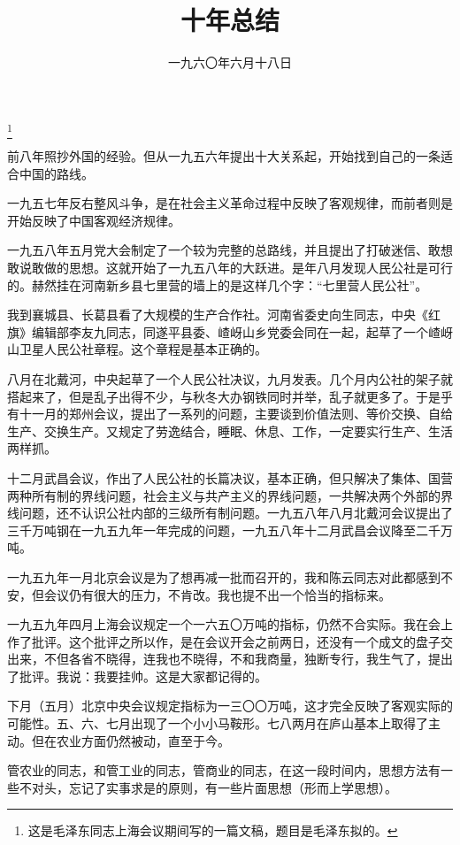 
\title{十年总结}
\date{一九六〇年六月十八日}
\thanks{这是毛泽东同志上海会议期间写的一篇文稿，题目是毛泽东拟的。}
\maketitle


前八年照抄外国的经验。但从一九五六年提出十大关系起，开始找到自己的一条适合中国的路线。

一九五七年反右整风斗争，是在社会主义革命过程中反映了客观规律，而前者则是开始反映了中国客观经济规律。

一九五八年五月党大会制定了一个较为完整的总路线，并且提出了打破迷信、敢想敢说敢做的思想。这就开始了一九五八年的大跃进。是年八月发现人民公社是可行的。赫然挂在河南新乡县七里营的墙上的是这样几个字：“七里营人民公社”。

我到襄城县、长葛县看了大规模的生产合作社。河南省委史向生同志，中央《红旗》编辑部李友九同志，同遂平县委、嵖岈山乡党委会同在一起，起草了一个嵖岈山卫星人民公社章程。这个章程是基本正确的。

八月在北戴河，中央起草了一个人民公社决议，九月发表。几个月内公社的架子就搭起来了，但是乱子出得不少，与秋冬大办钢铁同时并举，乱子就更多了。于是乎有十一月的郑州会议，提出了一系列的问题，主要谈到价值法则、等价交换、自给生产、交换生产。又规定了劳逸结合，睡眠、休息、工作，一定要实行生产、生活两样抓。

十二月武昌会议，作出了人民公社的长篇决议，基本正确，但只解决了集体、国营两种所有制的界线问题，社会主义与共产主义的界线问题，一共解决两个外部的界线问题，还不认识公社内部的三级所有制问题。一九五八年八月北戴河会议提出了三千万吨钢在一九五九年一年完成的问题，一九五八年十二月武昌会议降至二千万吨。

一九五九年一月北京会议是为了想再减一批而召开的，我和陈云同志对此都感到不安，但会议仍有很大的压力，不肯改。我也提不出一个恰当的指标来。

一九五九年四月上海会议规定一个一六五〇万吨的指标，仍然不合实际。我在会上作了批评。这个批评之所以作，是在会议开会之前两日，还没有一个成文的盘子交出来，不但各省不晓得，连我也不晓得，不和我商量，独断专行，我生气了，提出了批评。我说：我要挂帅。这是大家都记得的。

下月（五月）北京中央会议规定指标为一三〇〇万吨，这才完全反映了客观实际的可能性。五、六、七月出现了一个小小马鞍形。七八两月在庐山基本上取得了主动。但在农业方面仍然被动，直至于今。

管农业的同志，和管工业的同志，管商业的同志，在这一段时间内，思想方法有一些不对头，忘记了实事求是的原则，有一些片面思想（形而上学思想）。

